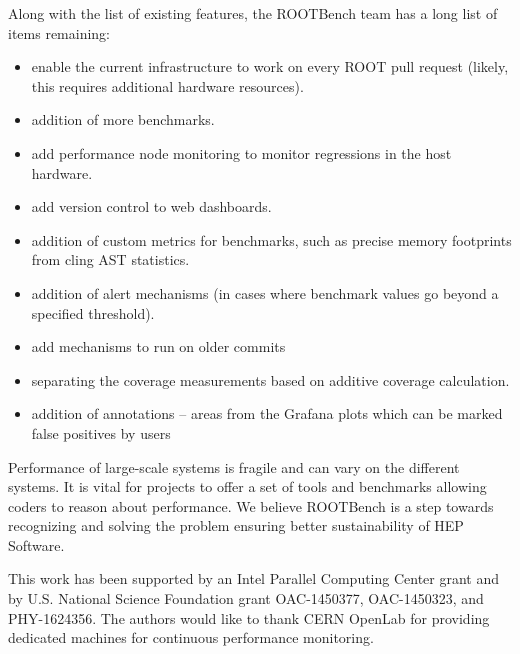 \documentclass{webofc}
\begin{document}
Along with the list of existing features, the ROOTBench team has a long list of items remaining:
\begin{itemize}
  \item enable the current infrastructure to work on every ROOT pull request (likely, this requires additional hardware resources).
  \item addition of more benchmarks.
  \item add performance node monitoring to monitor regressions in the host hardware.
  \item add version control to web dashboards.
  \item addition of custom metrics for benchmarks, such as precise memory footprints from cling AST statistics.
  \item addition of alert mechanisms (in cases where benchmark values go beyond a specified threshold).
    \item add mechanisms to run on older commits %
    \item separating the coverage measurements based on additive coverage calculation.
    \item addition of annotations -- areas from the Grafana plots which can be marked false positives by users
\end{itemize}


Performance of large-scale systems is fragile and can vary on the different systems. It is vital for  projects to offer a set of tools and benchmarks allowing coders to reason about performance. We believe ROOTBench is a step towards recognizing and solving the problem ensuring better sustainability of HEP Software.

{\small This work has been supported by an Intel Parallel Computing Center grant and by U.S. National Science Foundation grant OAC-1450377, OAC-1450323, and PHY-1624356.
The  authors would like to  thank CERN OpenLab for providing dedicated machines for continuous performance monitoring.}
\end{document}

